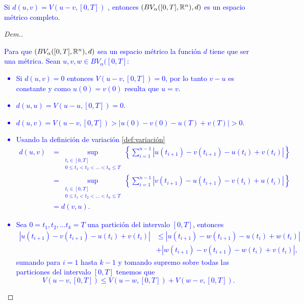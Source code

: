 
    
\begin{prop}\textcolor{blue}{ \label{pro:completo}
     Si $d(u,v)=V(u-v,[0,T])$ , entonces $\left(BV_\alpha([0,T],\mathbb{R}^n),d\right)$ es un espacio métrico completo.}
\end{prop}
\begin{proof}[Dem.]
    \textcolor{blue}{Para que $\left(BV_\alpha([0,T],\mathbb{R}^n),d\right)$ sea un espacio métrico la función $d$ tiene que ser una métrica. Sean $u,v,w\in BV_\alpha([0,T]$:
\begin{itemize}
\item Si $d(u,v)=0$ entonces $V(u-v,[0,T])=0$, por lo tanto $v-u$ es constante y como $u(0)=v(0)$ resulta que $u=v$. 
\item $d(u,u)=V(u-u,[0,T])=0$. 
\item $d(u,v)=V(u-v,[0,T])>|u(0)-v(0)-u(T)+v(T)|>0$.
\item Usando la definición de variación \ref{def:variación}
\begin{equation*}
    \begin{split}
    d(u,v)&=\sup_{\substack{ t_i\in [0,T]\\
0\leq t_1 < t_2< \dots < t_n  \leq T}}\left\lbrace \sum_{i=1}^{n-1}|u(t_{i+1})-v(t_{i+1})-u(t_i)+v(t_{i})|\right\rbrace\\&=
\sup_{\substack{ t_i\in [0,T]\\
0\leq t_1 < t_2< \dots < t_n  \leq T}}\left\lbrace \sum_{i=1}^{n-1}|v(t_{i+1})-u(t_{i+1})-v(t_i)+u(t_{i})|\right\rbrace\\&=d(v,u).
    \end{split}
\end{equation*}
\item Sea $0=t_1,t_2,\ldots t_k=T$ una partición del intervalo $[0,T]$, entonces
\begin{equation*}
    \begin{split}
        |u(t_{i+1})-v(t_{i+1})-u(t_i)+v(t_{i})|&   \leq |u(t_{i+1})-w(t_{i+1})-u(t_i)+w(t_{i})|\\&+ |w(t_{i+1})-v(t_{i+1})-w(t_i)+v(t_{i})|,
    \end{split}
\end{equation*}
sumando para $i=1$ hasta $k-1$ y tomando supremo sobre todas las particiones del intervalo $[0,T]$ tenemos que 
$$V(u-v,[0,T])\leq V(u-w,[0,T])+V(w-v,[0,T]).$$

\end{itemize}}
\end{proof}
